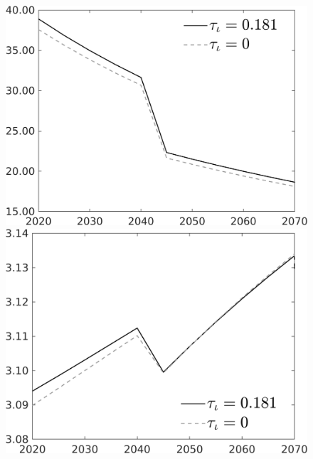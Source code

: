 \documentclass[12pt]{article}
\begin{document}
\begin{figure}[h!!]
\begin{minipage}[]{0.32\textwidth}
	\end{minipage}	
	\begin{minipage}[]{0.32\textwidth}
		\includegraphics[width=1\textwidth]{../../codding_model/own_basedOnFried/optimalPol_010922_revision/figures/all_13Sept22/CompTauf_bytaul_Reg0_gAf_spillover0_nsk0_xgr0_knspil1_sep1_LFlimit1_emsbase0_countec0_GovRev0_etaa0.79_lgd1.png}
	\end{minipage}	
	\begin{minipage}[]{0.32\textwidth}
		\includegraphics[width=1\textwidth]{../../codding_model/own_basedOnFried/optimalPol_010922_revision/figures/all_13Sept22/CompTauf_bytaul_Reg0_gAn_spillover0_nsk0_xgr0_knspil1_sep1_LFlimit1_emsbase0_countec0_GovRev0_etaa0.79_lgd1.png}

\end{minipage}
\end{figure}
\end{document}
